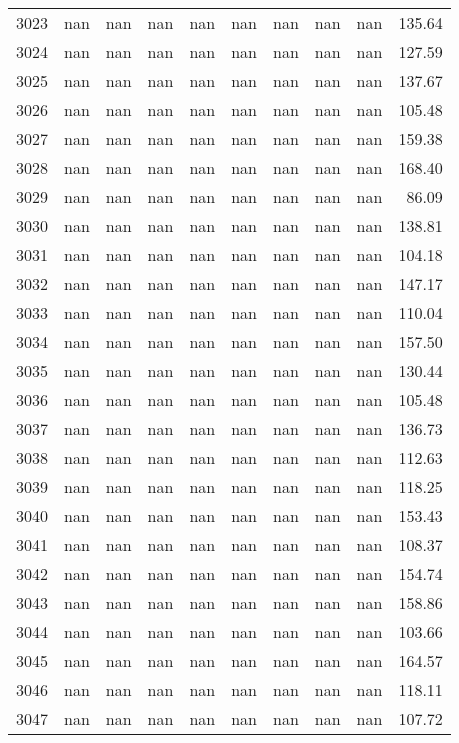 \begin{tabular}{lrrrrrrrrr}
3023 & nan & nan & nan & nan & nan & nan & nan & nan & 135.64 \\
3024 & nan & nan & nan & nan & nan & nan & nan & nan & 127.59 \\
3025 & nan & nan & nan & nan & nan & nan & nan & nan & 137.67 \\
3026 & nan & nan & nan & nan & nan & nan & nan & nan & 105.48 \\
3027 & nan & nan & nan & nan & nan & nan & nan & nan & 159.38 \\
3028 & nan & nan & nan & nan & nan & nan & nan & nan & 168.40 \\
3029 & nan & nan & nan & nan & nan & nan & nan & nan & 86.09 \\
3030 & nan & nan & nan & nan & nan & nan & nan & nan & 138.81 \\
3031 & nan & nan & nan & nan & nan & nan & nan & nan & 104.18 \\
3032 & nan & nan & nan & nan & nan & nan & nan & nan & 147.17 \\
3033 & nan & nan & nan & nan & nan & nan & nan & nan & 110.04 \\
3034 & nan & nan & nan & nan & nan & nan & nan & nan & 157.50 \\
3035 & nan & nan & nan & nan & nan & nan & nan & nan & 130.44 \\
3036 & nan & nan & nan & nan & nan & nan & nan & nan & 105.48 \\
3037 & nan & nan & nan & nan & nan & nan & nan & nan & 136.73 \\
3038 & nan & nan & nan & nan & nan & nan & nan & nan & 112.63 \\
3039 & nan & nan & nan & nan & nan & nan & nan & nan & 118.25 \\
3040 & nan & nan & nan & nan & nan & nan & nan & nan & 153.43 \\
3041 & nan & nan & nan & nan & nan & nan & nan & nan & 108.37 \\
3042 & nan & nan & nan & nan & nan & nan & nan & nan & 154.74 \\
3043 & nan & nan & nan & nan & nan & nan & nan & nan & 158.86 \\
3044 & nan & nan & nan & nan & nan & nan & nan & nan & 103.66 \\
3045 & nan & nan & nan & nan & nan & nan & nan & nan & 164.57 \\
3046 & nan & nan & nan & nan & nan & nan & nan & nan & 118.11 \\
3047 & nan & nan & nan & nan & nan & nan & nan & nan & 107.72 \\

\end{tabular}

